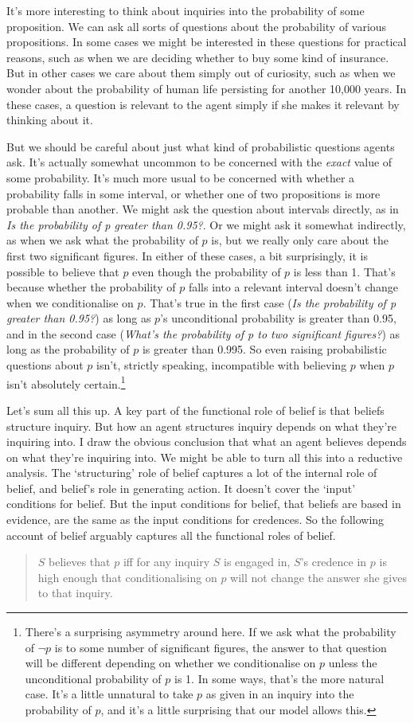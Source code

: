 It's more interesting to think about inquiries into the probability of some proposition. We can ask all sorts of questions about the probability of various propositions. In some cases we might be interested in these questions for practical reasons, such as when we are deciding whether to buy some kind of insurance. But in other cases we care about them simply out of curiosity, such as when we wonder about the probability of human life persisting for another 10,000 years. In these cases, a question is relevant to the agent simply if she makes it relevant by thinking about it.

But we should be careful about just what kind of probabilistic questions agents ask. It's actually somewhat uncommon to be concerned with the \textit{exact} value of some probability. It's much more usual to be concerned with whether a probability falls in some interval, or whether one of two propositions is more probable than another. We might ask the question about intervals directly, as in \textit{Is the probability of p greater than 0.95?}. Or we might ask it somewhat indirectly, as when we ask what the probability of \(p\) is, but we really only care about the first two significant figures. In either of these cases, a bit surprisingly, it is possible to believe that \(p\) even though the probability of \(p\) is less than 1. That's because whether the probability of \(p\) falls into a relevant interval doesn't change when we conditionalise on \(p\). That's true in the first case (\textit{Is the probability of p greater than 0.95?}) as long as \(p\)'s unconditional probability is greater than 0.95, and in the second case (\textit{What's the probability of p to two significant figures?}) as long as the probability of \(p\) is greater than 0.995. So even raising probabilistic questions about \(p\) isn't, strictly speaking, incompatible with believing \(p\) when \(p\) isn't absolutely certain.\footnote{There's a surprising asymmetry around here. If we ask what the probability of \(\neg p\) is to some number of significant figures, the answer to that question will be different depending on whether we conditionalise on \(p\) unless the unconditional probability of \(p\) is 1. In some ways, that's the more natural case. It's a little unnatural to take \(p\) as given in an inquiry into the probability of \(p\), and it's a little surprising that our model allows this.}

Let's sum all this up. A key part of the functional role of belief is that beliefs structure inquiry. But how an agent structures inquiry depends on what they're inquiring into. I draw the obvious conclusion that what an agent believes depends on what they're inquiring into. We might be able to turn all this into a reductive analysis. The `structuring' role of belief captures a lot of the internal role of belief, and belief's role in generating action. It doesn't cover the `input' conditions for belief. But the input conditions for belief, that beliefs are based in evidence, are the same as the input conditions for credences. So the following account of belief arguably captures all the functional roles of belief.

\begin{quote}
\(S\) believes that \(p\) iff for any inquiry \(S\) is engaged in, \(S\)'s credence in \(p\) is high enough that conditionalising on \(p\) will not change the answer she gives to that inquiry.
\end{quote}